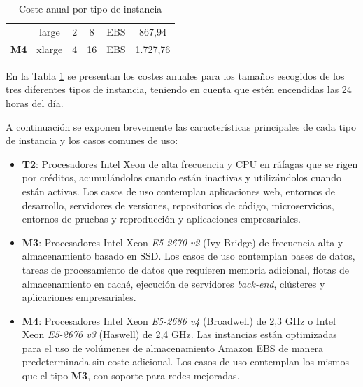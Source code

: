 \begin{table}
\begin{tabular}{cccccc}
\multicolumn{1}{|c|}{\cellcolor[HTML]{EFEFEF}}                              & \multicolumn{1}{c|}{large}                                   & \multicolumn{1}{c|}{2}                                    & \multicolumn{1}{c|}{8}                                                                                      & \multicolumn{1}{c|}{EBS}                                                                                          & \multicolumn{1}{c|}{867,94}                                                                             \\ \cline{2-6} 
\multicolumn{1}{|c|}{\multirow{-2}{*}{\cellcolor[HTML]{EFEFEF}\textbf{M4}}} & \multicolumn{1}{c|}{xlarge}                                  & \multicolumn{1}{c|}{4}                                    & \multicolumn{1}{c|}{16}                                                                                     & \multicolumn{1}{c|}{EBS}                                                                                          & \multicolumn{1}{c|}{1.727,76}                                                                           \\ \hline
                                                                          
\end{tabular}
\caption{Coste anual por tipo de instancia \label{tab:costeinstancia}}
\end{table}


En la Tabla \ref{tab:costeinstancia} se presentan los costes anuales para los tamaños escogidos de los tres diferentes tipos de instancia, teniendo en cuenta que estén encendidas las 24 horas del día.

A continuación se exponen brevemente las características principales de cada tipo de instancia y los casos comunes de uso:

\begin{itemize}
\item \textbf{T2}: Procesadores Intel Xeon de alta frecuencia y CPU en ráfagas que se rigen por créditos, acumulándolos cuando están inactivas y utilizándolos cuando están activas. Los casos de uso contemplan aplicaciones web, entornos de desarrollo, servidores de versiones, repositorios de código, microservicios, entornos de pruebas y reproducción y aplicaciones empresariales.
\item \textbf{M3}: Procesadores Intel Xeon \textit{E5-2670 v2} (Ivy Bridge) de frecuencia alta y almacenamiento basado en SSD. Los casos de uso contemplan bases de datos, tareas de procesamiento de datos que requieren memoria adicional, flotas de almacenamiento en caché, ejecución de servidores \textit{back-end}, clústeres y aplicaciones empresariales.
\item \textbf{M4}: Procesadores Intel Xeon \textit{E5-2686 v4} (Broadwell) de 2,3 GHz o Intel Xeon \textit{E5-2676 v3} (Haswell) de 2,4 GHz. Las instancias están optimizadas para el uso de volúmenes de almacenamiento Amazon EBS de manera predeterminada sin coste adicional. Los casos de uso contemplan los mismos que el tipo \textbf{M3}, con soporte para redes mejoradas.
\end{itemize}

